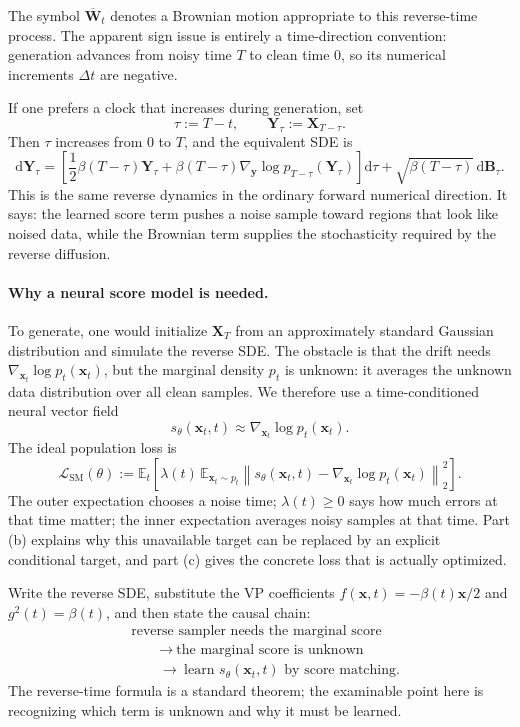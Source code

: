 \documentclass[11pt,a4paper]{article}
\theoremstyle{definition}
\begin{document}
\fi
The symbol $\overline{\mathbf{W}}_t$ denotes a Brownian motion appropriate to this
reverse-time process. The apparent sign issue is entirely a time-direction convention:
generation advances from noisy time $T$ to clean time $0$, so its numerical increments
$\Delta t$ are negative.

If one prefers a clock that increases during generation, set
\[
\tau:=T-t,
\qquad
\mathbf{Y}_\tau:=\mathbf{X}_{T-\tau}.
\]
Then $\tau$ increases from $0$ to $T$, and the equivalent SDE is
\[
\mathrm{d}\mathbf{Y}_\tau
=\left[
\frac12\beta(T-\tau)\mathbf{Y}_\tau
+\beta(T-\tau)
\nabla_{\mathbf{y}}\log p_{T-\tau}(\mathbf{Y}_\tau)
\right]\mathrm{d}\tau
+\sqrt{\beta(T-\tau)}\,\mathrm{d}\mathbf{B}_\tau.
\]
This is the same reverse dynamics in the ordinary forward numerical direction. It says:
the learned score term pushes a noise sample toward regions that look like noised data,
while the Brownian term supplies the stochasticity required by the reverse diffusion.

\paragraph{Why a neural score model is needed.}
To generate, one would initialize $\mathbf{X}_T$ from an approximately standard Gaussian
distribution and simulate the reverse SDE. The obstacle is that the drift needs
$\nabla_{\mathbf{x}_t}\log p_t(\mathbf{x}_t)$, but the marginal density $p_t$ is unknown:
it averages the unknown data distribution over all clean samples. We therefore use a
time-conditioned neural vector field
\[
s_\theta(\mathbf{x}_t,t)
\approx
\nabla_{\mathbf{x}_t}\log p_t(\mathbf{x}_t).
\]
The ideal population loss is
\[
\mathcal{L}_{\mathrm{SM}}(\theta)
:=
\mathbb{E}_{t}\left[
\lambda(t)\,
\mathbb{E}_{\mathbf{x}_t\sim p_t}
\left\|
s_\theta(\mathbf{x}_t,t)
-\nabla_{\mathbf{x}_t}\log p_t(\mathbf{x}_t)
\right\|_2^2
\right].
\]
The outer expectation chooses a noise time; $\lambda(t)\geq0$ says how much errors at
that time matter; the inner expectation averages noisy samples at that time. Part (b)
explains why this unavailable target can be replaced by an explicit conditional target,
and part (c) gives the concrete loss that is actually optimized.

\begin{note}
Write the reverse SDE, substitute the VP coefficients
$f(\mathbf{x},t)=-\beta(t)\mathbf{x}/2$ and $g^2(t)=\beta(t)$, and then state the
causal chain:
\[
\begin{aligned}
&\text{reverse sampler needs the marginal score}\\
&\qquad\longrightarrow\ \text{the marginal score is unknown}\\
&\qquad\longrightarrow\ \text{learn }s_\theta(\mathbf{x}_t,t)\text{ by score matching}.
\end{aligned}
\]
The reverse-time formula is a standard theorem; the examinable point here is recognizing
which term is unknown and why it must be learned.
\end{note}
\end{document}
